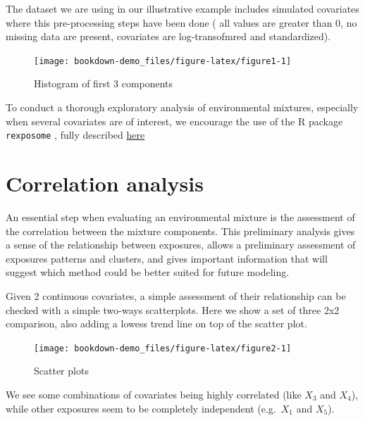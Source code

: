 \documentclass[
]{book}
\begin{document}
The dataset we are using in our illustrative example includes simulated covariates where this pre-processing steps have been done ( all values are greater than 0, no missing data are present, covariates are log-transofmred and standardized).

\begin{figure}[H]

{\centering \texttt{[image: bookdown-demo\_files/figure-latex/figure1-1]} 

}

\caption{Histogram of first 3 components}\label{fig:figure1}
\end{figure}

To conduct a thorough exploratory analysis of environmental mixtures, especially when several covariates are of interest, we encourage the use of the R package \texttt{rexposome} , fully described \href{https://www.bioconductor.org/packages/release/bioc/vignettes/rexposome/inst/doc/exposome_data_analysis.html\#multivariate-exposome-analysis}{here}

\hypertarget{correlation-analysis}{%
\section{Correlation analysis}\label{correlation-analysis}}

An essential step when evaluating an environmental mixture is the assessment of the correlation between the mixture components. This preliminary analysis gives a sense of the relationship between exposures, allows a preliminary assessment of exposures patterns and clusters, and gives important information that will suggest which method could be better suited for future modeling.

Given 2 continuous covariates, a simple assessment of their relationship can be checked with a simple two-ways scatterplots. Here we show a set of three 2x2 comparison, also adding a lowess trend line on top of the scatter plot.

\begin{figure}[H]

{\centering \texttt{[image: bookdown-demo\_files/figure-latex/figure2-1]} 

}

\caption{Scatter plots}\label{fig:figure2}
\end{figure}

We see some combinations of covariates being highly correlated (like \(X_3\) and \(X_4\)), while other exposures seem to be completely independent (e.g.~\(X_1\) and \(X_5\)).
\end{document}
